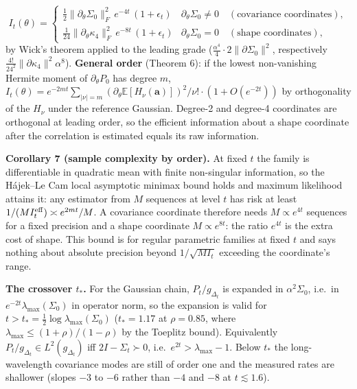 \begin{equation}\label{eq:info}
I_t(\theta)=\begin{cases}\tfrac12\|\partial_\theta\Sigma_0\|_F^2\,e^{-4t}\,(1+\epsilon_t)&\partial_\theta\Sigma_0\ne0\quad(\text{covariance coordinates}),\\[2pt]
\tfrac1{24}\|\partial_\theta\kappa_4\|_F^2\,e^{-8t}\,(1+\epsilon_t)&\partial_\theta\Sigma_0=0\quad(\text{shape coordinates}),\end{cases}
\end{equation}
by Wick's theorem applied to the leading grade ($\tfrac{\alpha^4}{4}\cdot2\|\partial\Sigma_0\|^2$, respectively $\tfrac{4!}{24^2}\|\partial\kappa_4\|^2\alpha^8$). \textbf{General order} (Theorem 6): if the lowest non-vanishing Hermite moment of $\partial_\theta P_0$ has degree $m$,
$I_t(\theta)=e^{-2mt}\sum_{|\nu|=m}(\partial_\theta\mathbb E[H_\nu(\mathbf a)])^2/\nu!\cdot(1+O(e^{-2t}))$ by orthogonality of the $H_\nu$ under the reference Gaussian. Degree-2 and degree-4 coordinates are orthogonal at leading order, so the efficient information about a shape coordinate after the correlation is estimated equals its raw information.

\textbf{Corollary 7 (sample complexity by order).} At fixed $t$ the family is differentiable in quadratic mean with finite non-singular information, so the H\'ajek--Le Cam local asymptotic minimax bound holds and maximum likelihood attains it: any estimator from $M$ sequences at level $t$ has risk at least $1/(MI_t^{\rm eff})\asymp e^{2mt}/M$.
A covariance coordinate therefore needs $M\propto e^{4t}$ sequences for a fixed precision and a shape coordinate $M\propto e^{8t}$: the ratio $e^{4t}$ is the extra cost of shape. This bound is for regular parametric families at fixed $t$ and says nothing about absolute precision beyond $1/\sqrt{MI_t}$ exceeding the coordinate's range.

\textbf{The crossover $t_*$.} For the Gaussian chain, $P_t/g_{\Delta_t}$ is expanded in $\alpha^2\Sigma_0$, i.e.\ in $e^{-2t}\lambda_{\max}(\Sigma_0)$ in operator norm, so the expansion is valid for $t>t_*=\tfrac12\log\lambda_{\max}(\Sigma_0)$ ($t_*=1.17$ at $\rho=0.85$, where $\lambda_{\max}\le(1+\rho)/(1-\rho)$ by the Toeplitz bound).
Equivalently $P_t/g_{\Delta_t}\in L^2(g_{\Delta_t})$ iff $2I-\Sigma_t\succ0$, i.e.\ $e^{2t}>\lambda_{\max}-1$. Below $t_*$ the long-wavelength covariance modes are still of order one and the measured rates are shallower (slopes $-3$ to $-6$ rather than $-4$ and $-8$ at $t\lesssim1.6$).

